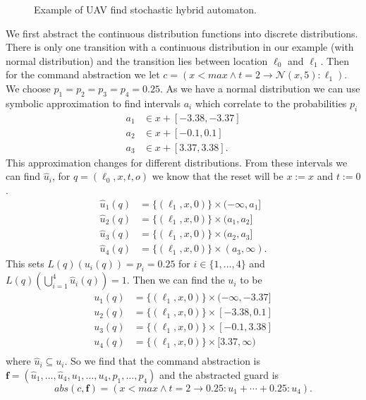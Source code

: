 \begin{ex}
\begin{figure}[H]
\begin{center}
\begin{tikzpicture}[node distance=5cm]
        \end{tikzpicture}
        \caption{Example of UAV find stochastic hybrid automaton.}
         \label{fig:shauav}
     \end{center}
\end{figure}
We first abstract the continuous distribution functions into discrete distributions. There is only one transition with a continuous distribution in our example (with normal distribution) and the transition lies between location $\ell_{0}$ and $\ell_{1}$. Then for the command abstraction we let $c=(x<max\land t=2\rightarrow \mathcal{N}(x,5):\ell_{1})$. We choose $p_{1}=p_{2}=p_{3}=p_{4}=0.25$. As we have a normal distribution we can use symbolic approximation to find intervals $a_{i}$ which correlate to the probabilities $p_{i}$
\begin{align*}
    a_{1} &\in x+[-3.38,-3.37] \\
    a_{2} &\in x+[-0.1,0.1] \\
    a_{3} &\in x+[3.37,3.38] .
\end{align*}
This approximation changes for different distributions.
From these intervals we can find $\hat{u}_{i}$, for $q=(\ell_{0},x,t,o)$ we know that the reset will be $x:=x$ and $t:=0$.
\begin{align*}
    \hat{u}_{1}(q) & = \{(\ell_{1},x,0)\}\times(-\infty,a_{1}] \\
    \hat{u}_{2}(q) & = \{(\ell_{1},x,0)\}\times(a_{1},a_{2}] \\
    \hat{u}_{3}(q) & = \{(\ell_{1},x,0)\}\times(a_{2},a_{3}] \\
    \hat{u}_{4}(q) & = \{(\ell_{1},x,0)\}\times(a_{3},\infty).
\end{align*}
This sets $L(q)(u_{i}(q))=p_{i}=0.25$ for $i\in\{1,\ldots,4\}$ and $L(q)(\bigcup_{i=1}^{4}\hat{u}_{i}(q))=1$.
Then we can find the $u_{i}$ to be
\begin{align*}
    u_{1}(q) & = \{(\ell_{1},x,0)\}\times(-\infty,-3.37] \\
    u_{2}(q) & = \{(\ell_{1},x,0)\}\times[-3.38,0.1] \\
    u_{3}(q) & = \{(\ell_{1},x,0)\}\times[-0.1,3.38] \\
    u_{4}(q) & = \{(\ell_{1},x,0)\}\times[3.37,\infty) \\
\end{align*}
where $\hat{u}_{i}\subseteq u_{i}$. So we find that the command abstraction is $\mathbf{f}=(\hat{u}_{1},\ldots,\hat{u}_{4},u_{1},\ldots,u_{4},p_{1},\ldots,p_{4})$ and the abstracted guard is
\[
abs(c,\mathbf{f}) = (x<max\land t=2\rightarrow 0.25:u_{1}+\cdots+0.25:u_{4}).
\]


\end{ex}
